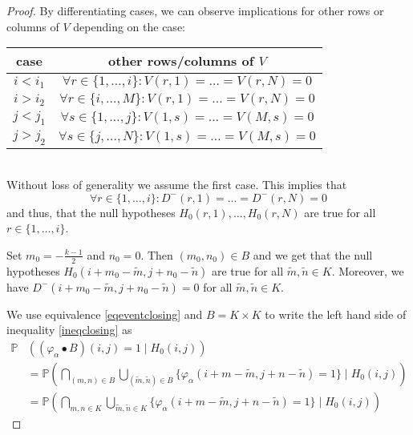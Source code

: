 \documentclass[a4paper,12pt]{article}
\theoremstyle{plain}
\theoremstyle{definition}
\theoremstyle{remark}
\begin{document}
\begin{proof}
	By differentiating cases, we can observe implications for other rows or columns of $V$ depending on the case:\\
	
	\begin{tabular}{|c|c|}
		\hline
		\textbf{case} & \textbf{other rows/columns of $V$} \\
		\hline
		$i < i_1$ & $\forall r \in \{ 1, \dots, i \}: V(r, 1) = \dots = V(r, N) = 0$ \\
		\hline
		$i > i_2$ & $\forall r \in \{ i, \dots, M \}: V(r, 1) = \dots = V(r, N) = 0$ \\
		\hline
		$j < j_1$ & $\forall s \in \{ 1, \dots, j \}: V(1, s) = \dots = V(M, s) = 0$ \\
		\hline
		$j > j_2$ & $\forall s \in \{ j, \dots, N \}: V(1, s) = \dots = V(M, s) = 0$ \\
		\hline
	\end{tabular}\\
	
	Without loss of generality we assume the first case. This implies that
	\begin{equation*}
		\forall r \in \{ 1, \dots, i \}: D^-(r, 1) = \dots = D^-(r, N) = 0
	\end{equation*}
	and thus, that the null hypotheses $H_0(r, 1), \dots, H_0(r, N)$ are true for all $r \in \{ 1, \dots, i \}$.
	
	Set $m_0 = -\frac{k - 1}{2}$ and $n_0 = 0$. Then $(m_0, n_0) \in B$ and we get that the null hypotheses $H_0(i + m_0 - \tilde{m}, j + n_0 - \tilde{n})$ are true for all $\tilde{m}, \tilde{n} \in K$. Moreover, we have $D^-(i + m_0 - \tilde{m}, j + n_0 - \tilde{n}) = 0$ for all $\tilde{m}, \tilde{n} \in K$.
	
	We use equivalence \eqref{eqeventclosing} and $B = K \times K$ to write the left hand side of inequality \eqref{ineqclosing} as
	\begin{align*}
		\mathbb{P}&( (\varphi_\alpha \bullet B)(i, j) = 1 \mid H_0(i, j) ) \\
		&= \mathbb{P}\left( \bigcap_{(m, n) \in B} \bigcup_{(\tilde{m}, \tilde{n}) \in B} \{ \varphi_\alpha(i + m - \tilde{m}, j + n - \tilde{n}) = 1 \} \mid H_0(i, j) \right) \\
		&= \mathbb{P}\left( \bigcap_{m, n \in K} \bigcup_{\tilde{m}, \tilde{n} \in K} \{ \varphi_\alpha(i + m - \tilde{m}, j + n - \tilde{n}) = 1 \} \mid H_0(i, j) \right)
	\end{align*}
	

\end{proof}
\end{document}
